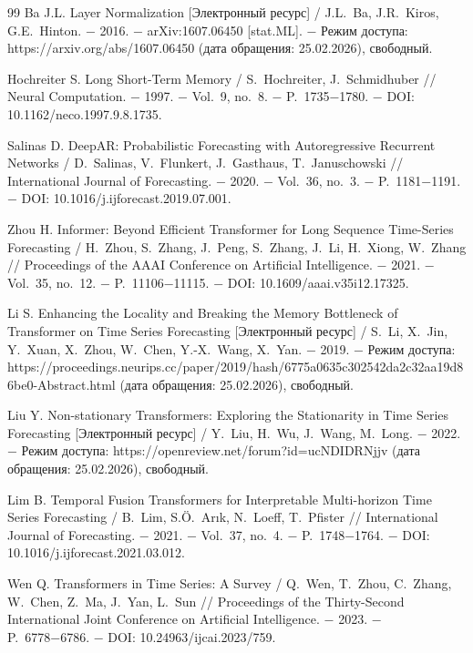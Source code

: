 \documentclass[a4paper,14pt]{extarticle}
\begin{document}
\begin{thebibliography}{99}
 Ba J.L. Layer Normalization [Электронный ресурс] / J.L.~Ba, J.R.~Kiros, G.E.~Hinton. − 2016. − arXiv:1607.06450 [stat.ML]. − Режим доступа: https://arxiv.org/abs/1607.06450 (дата обращения: 25.02.2026), свободный.

 Hochreiter S. Long Short-Term Memory / S.~Hochreiter, J.~Schmidhuber // Neural Computation. − 1997. − Vol.~9, no.~8. − P.~1735−1780. − DOI: 10.1162/neco.1997.9.8.1735.

 Salinas D. DeepAR: Probabilistic Forecasting with Autoregressive Recurrent Networks / D.~Salinas, V.~Flunkert, J.~Gasthaus, T.~Januschowski // International Journal of Forecasting. − 2020. − Vol.~36, no.~3. − P.~1181−1191. − DOI: 10.1016/j.ijforecast.2019.07.001.

 Zhou H. Informer: Beyond Efficient Transformer for Long Sequence Time-Series Forecasting / H.~Zhou, S.~Zhang, J.~Peng, S.~Zhang, J.~Li, H.~Xiong, W.~Zhang // Proceedings of the AAAI Conference on Artificial Intelligence. − 2021. − Vol.~35, no.~12. − P.~11106−11115. − DOI: 10.1609/aaai.v35i12.17325.

 Li S. Enhancing the Locality and Breaking the Memory Bottleneck of Transformer on Time Series Forecasting [Электронный ресурс] / S.~Li, X.~Jin, Y.~Xuan, X.~Zhou, W.~Chen, Y.-X.~Wang, X.~Yan. − 2019. − Режим доступа: https://proceedings.neurips.cc/paper/2019/hash/6775a0635c302542da2c32aa19d86be0-Abstract.html (дата обращения: 25.02.2026), свободный.

 Liu Y. Non-stationary Transformers: Exploring the Stationarity in Time Series Forecasting [Электронный ресурс] / Y.~Liu, H.~Wu, J.~Wang, M.~Long. − 2022. − Режим доступа: https://openreview.net/forum?id=ucNDIDRNjjv (дата обращения: 25.02.2026), свободный.

 Lim B. Temporal Fusion Transformers for Interpretable Multi-horizon Time Series Forecasting / B.~Lim, S.Ö.~Arık, N.~Loeff, T.~Pfister // International Journal of Forecasting. − 2021. − Vol.~37, no.~4. − P.~1748−1764. − DOI: 10.1016/j.ijforecast.2021.03.012.

 Wen Q. Transformers in Time Series: A Survey / Q.~Wen, T.~Zhou, C.~Zhang, W.~Chen, Z.~Ma, J.~Yan, L.~Sun // Proceedings of the Thirty-Second International Joint Conference on Artificial Intelligence. − 2023. − P.~6778−6786. − DOI: 10.24963/ijcai.2023/759.


\end{thebibliography}
\end{document}
